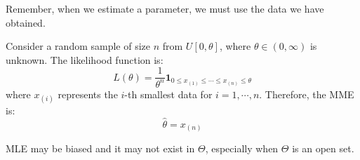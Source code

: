 \documentclass{huhtakm-template-book-v2}
\begin{document}
\begin{rem}
	Remember, when we estimate a parameter, we must use the data we have obtained.
\end{rem}
\begin{eg}
	Consider a random sample of size $n$ from $U[0,\theta]$, where $\theta\in(0,\infty)$ is unknown. The likelihood function is:
	\begin{equation*}
		L(\theta)=\frac{1}{\theta^{n}}\mathbf{1}_{0\leq x_{(1)}\leq\cdots\leq x_{(n)}\leq\theta}
	\end{equation*}
	where $x_{(i)}$ represents the $i$-th smallest data for $i=1,\cdots,n$. Therefore, the MME is:
	\begin{equation*}
		\hat{\theta}=x_{(n)}
	\end{equation*}
\end{eg}
\begin{rem}
	MLE may be biased and it may not exist in $\Theta$, especially when $\Theta$ is an open set.
\end{rem}
\end{document}
